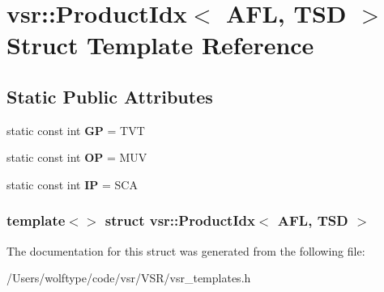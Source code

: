 \hypertarget{structvsr_1_1_product_idx_3_01_a_f_l_00_01_t_s_d_01_4}{\section{vsr\-:\-:Product\-Idx$<$ A\-F\-L, T\-S\-D $>$ Struct Template Reference}
\label{structvsr_1_1_product_idx_3_01_a_f_l_00_01_t_s_d_01_4}
}
\subsection*{Static Public Attributes}
\begin{DoxyCompactItemize}
\item 
\hypertarget{structvsr_1_1_product_idx_3_01_a_f_l_00_01_t_s_d_01_4_a70d3a4330b27ca051be27828df612b5a}{static const int {\bfseries G\-P} = T\-V\-T}\label{structvsr_1_1_product_idx_3_01_a_f_l_00_01_t_s_d_01_4_a70d3a4330b27ca051be27828df612b5a}

\item 
\hypertarget{structvsr_1_1_product_idx_3_01_a_f_l_00_01_t_s_d_01_4_ad3314186bf7f17c979fd16c1eba6e5ef}{static const int {\bfseries O\-P} = M\-U\-V}\label{structvsr_1_1_product_idx_3_01_a_f_l_00_01_t_s_d_01_4_ad3314186bf7f17c979fd16c1eba6e5ef}

\item 
\hypertarget{structvsr_1_1_product_idx_3_01_a_f_l_00_01_t_s_d_01_4_a3a4a8194aa6ae6ceb99fc1ec61f9debc}{static const int {\bfseries I\-P} = S\-C\-A}\label{structvsr_1_1_product_idx_3_01_a_f_l_00_01_t_s_d_01_4_a3a4a8194aa6ae6ceb99fc1ec61f9debc}

\end{DoxyCompactItemize}
\subsubsection*{template$<$$>$ struct vsr\-::\-Product\-Idx$<$ A\-F\-L, T\-S\-D $>$}



The documentation for this struct was generated from the following file\-:\begin{DoxyCompactItemize}
\item 
/\-Users/wolftype/code/vsr/\-V\-S\-R/vsr\-\_\-templates.\-h\end{DoxyCompactItemize}
